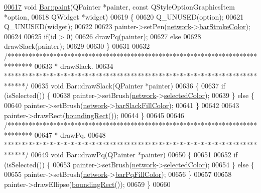 \begin{DoxyCode}
\hypertarget{bar_8cpp_source_l00617}{}\hyperlink{group___models_gacbb6dbac607412c9c1f9dfcd0cd4d432}{00617} \textcolor{keywordtype}{void} \hyperlink{group___models_gacbb6dbac607412c9c1f9dfcd0cd4d432}{Bar::paint}(QPainter *painter, \textcolor{keyword}{const} QStyleOptionGraphicsItem *option,
00618                 QWidget *widget)
00619 \{
00620   Q\_UNUSED(option);
00621   Q\_UNUSED(widget);
00622 
00623   painter->setPen(\hyperlink{class_bar_a80025f13884750add58cc61b318357ff}{network}->\hyperlink{class_network_ad69052271ab0a9899948815b6201f2c6}{barStrokeColor});
00624 
00625   \textcolor{keywordflow}{if}(\textcolor{keywordtype}{id} > 0)
00626     drawPq(painter);
00627   \textcolor{keywordflow}{else}
00628     drawSlack(painter);
00629 
00630 \}
00631 
00632 \textcolor{comment}{/*******************************************************************************}
00633 \textcolor{comment}{ * drawSlack.}
00634 \textcolor{comment}{ ******************************************************************************/}
00635 \textcolor{keywordtype}{void} Bar::drawSlack(QPainter *painter)
00636 \{
00637   \textcolor{keywordflow}{if} (isSelected()) \{
00638     painter->setBrush(\hyperlink{class_bar_a80025f13884750add58cc61b318357ff}{network}->\hyperlink{group___graphics_gaa9e21b8e2a24b0495e776a51e1aeed94}{selectedColor});
00639   \} \textcolor{keywordflow}{else} \{
00640     painter->setBrush(\hyperlink{class_bar_a80025f13884750add58cc61b318357ff}{network}->\hyperlink{class_network_ad78d9a206daf4ba0780067b5043c7f5c}{barSlackFillColor});
00641   \}
00642 
00643   painter->drawRect(\hyperlink{group___models_ga8279d8109019cc7e139e2023690496be}{boundingRect}());
00644 \}
00645 
00646 \textcolor{comment}{/*******************************************************************************}
00647 \textcolor{comment}{ * drawPq.}
00648 \textcolor{comment}{ ******************************************************************************/}
00649 \textcolor{keywordtype}{void} Bar::drawPq(QPainter *painter)
00650 \{
00651 
00652   \textcolor{keywordflow}{if} (isSelected()) \{
00653     painter->setBrush(\hyperlink{class_bar_a80025f13884750add58cc61b318357ff}{network}->\hyperlink{group___graphics_gaa9e21b8e2a24b0495e776a51e1aeed94}{selectedColor});
00654   \} \textcolor{keywordflow}{else} \{
00655     painter->setBrush(\hyperlink{class_bar_a80025f13884750add58cc61b318357ff}{network}->\hyperlink{class_network_a386f492f548ec13f5d0e350c4f2217aa}{barPqFillColor});
00656   \}
00657 
00658   painter->drawEllipse(\hyperlink{group___models_ga8279d8109019cc7e139e2023690496be}{boundingRect}());
00659 \}
00660 
\end{DoxyCode}
